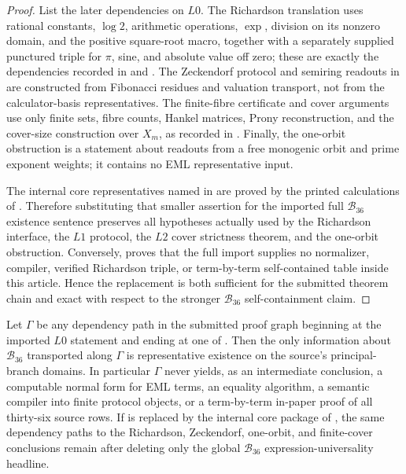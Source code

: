 \begin{proof}
List the later dependencies on \(L0\).  The Richardson translation uses rational
constants, \(\log2\), arithmetic operations, \(\exp\), division on its nonzero
domain, and the positive square-root macro, together with a separately supplied
punctured triple for \(\pi\), sine, and absolute value off zero; these are exactly
the dependencies recorded in  and
.  The Zeckendorf protocol and semiring readouts in
 are constructed from Fibonacci residues and
valuation transport, not from the calculator-basis representatives.  The
finite-fibre certificate and cover arguments use only finite sets, fibre counts,
Hankel matrices, Prony reconstruction, and the cover-size construction over
\(X_m\), as recorded in .
Finally, the one-orbit obstruction is a statement about readouts from a free
monogenic orbit and prime exponent weights; it contains no EML representative
input.

The internal core representatives named in
 are proved by the printed calculations of
.  Therefore substituting
that smaller assertion for the imported full \(\mathcal B_{36}\) existence
sentence preserves all hypotheses actually used by the Richardson interface,
the \(L1\) protocol, the \(L2\) cover strictness theorem, and the one-orbit
obstruction.  Conversely,  proves that the full
import supplies no normalizer, compiler, verified Richardson triple, or
term-by-term self-contained table inside this article.  Hence the replacement is
both sufficient for the submitted theorem chain and exact with respect to the
stronger \(\mathcal B_{36}\) self-containment claim.
\end{proof}

\begin{proposition}
\label{prop:no-hidden-B36-compiler-spine}
Let \(\Gamma\) be any dependency path in the submitted proof graph beginning at
the imported \(L0\) statement  and ending at one of
.
Then the only information about \(\mathcal B_{36}\) transported along \(\Gamma\)
is representative existence on the source's principal-branch domains.  In
particular \(\Gamma\) never yields, as an intermediate conclusion, a computable
normal form for EML terms, an equality algorithm, a semantic compiler into
finite protocol objects, or a term-by-term in-paper proof of all thirty-six
source rows.  If  is replaced by the internal core
package of , the same dependency paths to
the Richardson, Zeckendorf, one-orbit, and finite-cover conclusions remain after
deleting only the global \(\mathcal B_{36}\) expression-universality headline.
\end{proposition}


